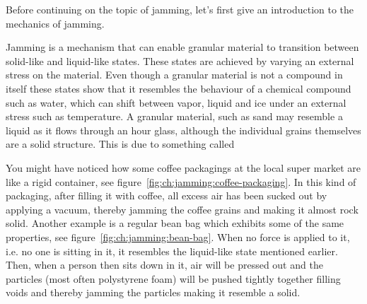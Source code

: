 Before continuing on the topic of jamming, let's first give an introduction to the mechanics of jamming.

Jamming is a mechanism that can enable granular material to transition between solid-like and liquid-like states. 
These states are achieved by varying an external stress on the material.
Even though a granular material is not a compound in itself these states show that it resembles the behaviour of a chemical compound such as water, which can shift between vapor, liquid and ice under an external stress such as temperature.
A granular material, such as sand may resemble a liquid as it flows through an hour glass, although the individual grains themselves are a solid structure. This is due to something called 

You might have noticed how some coffee packagings at the local super market are like a rigid container, see figure~\ref{fig:ch:jamming:coffee-packaging}. 
In this kind of packaging, after filling it with coffee, all excess air has been sucked out by applying a vacuum, thereby jamming the coffee grains and making it almost rock solid. 
Another example is a regular bean bag which exhibits some of the same properties, see figure~\ref{fig:ch:jamming:bean-bag}. 
When no force is applied to it, i.e. no one is sitting in it, it resembles the liquid-like state mentioned earlier. 
Then, when a person then sits down in it, air will be pressed out and the particles (most often polystyrene foam) will be pushed tightly together filling voids and thereby jamming the particles making it resemble a solid.

